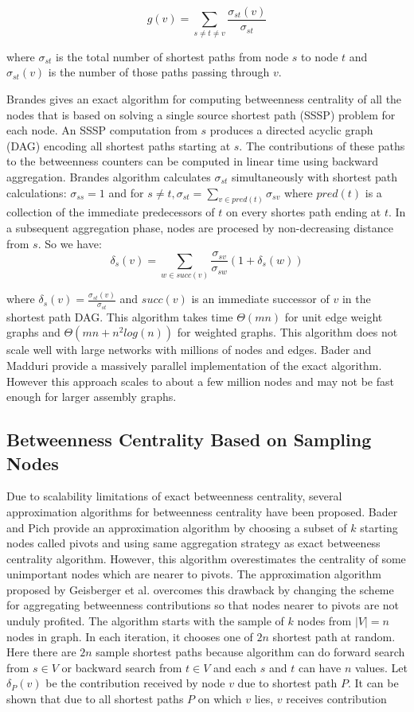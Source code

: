 \documentclass[runningheads,a4paper]{llncs}
\begin{document}
$$g(v) = \sum_{s \neq t \neq v} \frac{\sigma_{st}(v)}{\sigma_{st}}$$

where $\sigma_{st}$ is the total number of shortest paths from node $s$ to node $t$ and $\sigma_{st}(v)$ is the number of those paths passing through $v$.

Brandes\cite{brandes} gives an exact algorithm for computing betweenness centrality of all the nodes that is based on solving a single source shortest path (SSSP) problem for each node. An SSSP computation from $s$ produces a directed acyclic graph (DAG) encoding all shortest paths starting at $s$.   The contributions of these paths to the betweenness counters can be computed in linear time using backward aggregation. Brandes algorithm calculates $\sigma_{st}$  simultaneously with shortest path calculations: $\sigma_{ss} = 1$ and for $s \neq t, \sigma_{st} = \sum_{v \in pred(t)} \sigma_{sv}$ where $pred(t)$ is a collection of the immediate predecessors of  $t$ on every shortes path ending at $t$. In a subsequent aggregation phase, nodes are procesed by non-decreasing distance from $s$. So we have: 
$$\delta_{s}(v) = \sum_{w \in succ(v)} \frac{\sigma_{sv}}{\sigma_{sw}}(1+\delta_{s}(w))$$

where $\delta_{s}(v) = \frac{\sigma_{st}(v)}{\sigma_{st}}$ and $succ(v)$ is an immediate successor of $v$  in the shortest path DAG.   
This algorithm takes time $\Theta(mn)$ for unit edge weight graphs and $\Theta(mn + n^{2}log(n))$ for weighted graphs. This algorithm does not scale well with large networks with millions of nodes and edges. Bader and Madduri\cite{bader} provide a massively parallel implementation of the exact algorithm. However this approach scales to about a few million nodes and may not be fast enough for larger assembly graphs. 

\subsection*{Betweenness Centrality Based on Sampling Nodes}
Due to scalability limitations of exact betweenness centrality, several approximation algorithms for betweenness centrality have been proposed. Bader and Pich\cite{bp} provide an approximation algorithm by choosing a subset of $k$ starting nodes called pivots and using same aggregation strategy as exact betweeness centrality algorithm. However, this algorithm overestimates the centrality of some unimportant nodes which are nearer to pivots. The approximation algorithm proposed by Geisberger et al. \cite{sanders} overcomes this drawback by changing the scheme for aggregating betweenness contributions so that nodes nearer to pivots are not unduly profited. The algorithm starts with the sample of $k$ nodes from $|V| = n$ nodes in graph. In each iteration, it chooses one of $2n$ shortest path at random. Here there are $2n$ sample shortest paths because algorithm can do forward search from $s \in V$ or backward search from $t \in V$ and each $s$ and $t$ can have $n$ values. Let $\delta_{P}(v)$ be the contribution received by node $v$ due to shortest path $P$. It can be shown that \cite{sanders} due to all shortest paths $P$ on which $v$ lies, $v$ receives contribution 
\end{document}
